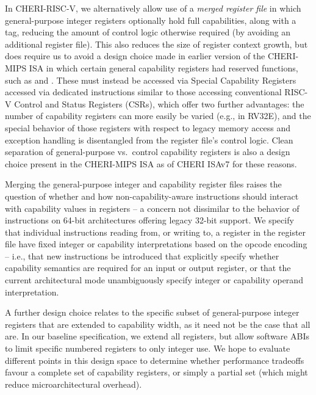 In CHERI-RISC-V, we alternatively allow use of a \textit{merged
register file} in which general-purpose integer registers optionally hold
full
capabilities, along with a tag, reducing the amount of control logic otherwise
required (by avoiding an additional register file).
This also reduces the size of register context growth, but does require us to
avoid a design choice made in earlier version of the CHERI-MIPS ISA in which
certain general capability registers had reserved functions, such as \DDC{}
and \EPCC{}.
These must instead be accessed via Special Capability Registers accessed via
dedicated instructions similar to those accessing conventional RISC-V Control
and Status Registers (CSRs), which offer
two further advantages: the number of capability
registers can more easily be varied (e.g., in RV32E), and the special behavior
of those registers with respect to legacy memory access and exception handling
is disentangled from the register file's control logic.
Clean separation of general-purpose vs.\ control capability registers is also a
design choice present in the CHERI-MIPS ISA as of CHERI ISAv7 for these
reasons.

Merging the general-purpose integer and capability register files raises the
question of whether and how non-capability-aware instructions should
interact with capability values in registers -- a concern not dissimilar to
the behavior of instructions on 64-bit architectures offering legacy 32-bit
support.
We specify that individual instructions reading from, or writing to, a
register in the register file have fixed integer or capability interpretations
based on the opcode encoding -- i.e., that new instructions be introduced that
explicitly specify whether capability semantics are required for an input or
output register, or that the current architectural mode unambiguously specify
integer or capability operand interpretation.

A further design choice relates to the specific subset of general-purpose
integer registers that are extended to capability width, as it need not be the
case that all are.
In our baseline specification, we extend all registers, but allow software
ABIs to limit specific numbered registers to only integer use.
We hope to evaluate different points in this design space to determine whether
performance tradeoffs favour a complete set of capability registers, or simply
a partial set (which might reduce microarchitectural overhead).

